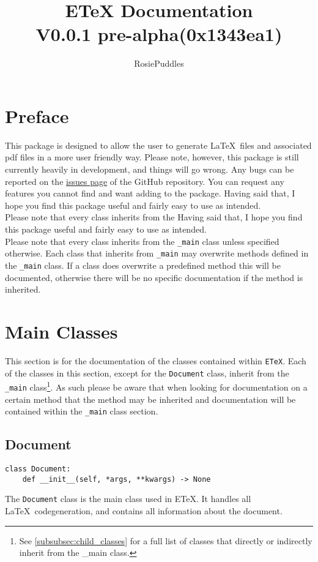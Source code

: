 \documentclass{article}
\title{ETeX Documentation\\\large V0.0.1 pre-alpha(0x1343ea1)}
\date{}
\author{RosiePuddles}
\begin{document}
\maketitle
\tableofcontents
\newpage

\section{Preface}\label{sec:preface}
This package is designed to allow the user to generate \LaTeX\ files and associated pdf files in a more user friendly way. Please note, however, this package is still currently heavily in development, and things will go wrong. Any bugs can be reported on the \href{https://github.com/RosiePuddles/ETeX\_from\_python/issues}{issues page} of the GitHub repository. You can request any features you cannot find and want adding to the package. Having said that, I hope you find this package useful and fairly easy to use as intended.\\
Please note that every class inherits from the  Having said that, I hope you find this package useful and fairly easy to use as intended.\\
Please note that every class inherits from the \verb|_main| class unless specified otherwise. Each class that inherits from \verb|_main| may overwrite methods defined in the \verb|_main| class. If a class does overwrite a predefined method this will be documented, otherwise there will be no specific documentation if the method is inherited.
\section{Main Classes}\label{sec:main_classes}
This section is for the documentation of the classes contained within \verb|ETeX|. Each of the classes in this section, except for the \verb|Document| class, inherit from the \verb|_main| class\footnote{See \autoref{subsubsec:child_classes} for a full list of classes that directly or indirectly inherit from the \_main class.}. As such please be aware that when looking for documentation on a certain method that the method may be inherited and documentation will be contained within the \verb|_main| class section.
\subsection{Document}\label{subsec:document}
\begin{verbatim}
class Document:
	def __init__(self, *args, **kwargs) -> None
\end{verbatim}
The \verb|Document| class is the main class used in ETeX. It handles all \LaTeX\ codegeneration, and contains all information about the document.
\end{document}
